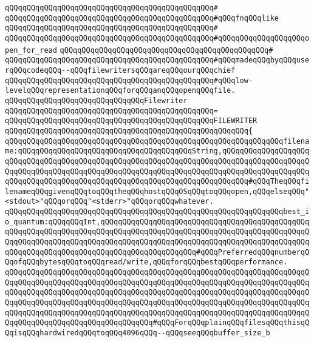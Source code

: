 \verb|qQQqqQQqqQQqqQQqqQQqqQQqqQQqqQQqqQQqqQQqqQQqqQQq#|\newline
\verb|qQQqqQQqqQQqqQQqqQQqqQQqqQQqqQQqqQQqqQQqqQQqqQQq#qQQqfnqQQqlike|\newline
\verb|qQQqqQQqqQQqqQQqqQQqqQQqqQQqqQQqqQQqqQQqqQQqqQQq#|\newline
\verb|qQQqqQQqqQQqqQQqqQQqqQQqqQQqqQQqqQQqqQQqqQQqqQQq#qQQqqQQqqQQqqQQqqQQqopen_for_read|\newline
\verb|qQQqqQQqqQQqqQQqqQQqqQQqqQQqqQQqqQQqqQQqqQQqqQQq#|\newline
\verb|qQQqqQQqqQQqqQQqqQQqqQQqqQQqqQQqqQQqqQQqqQQqqQQq#qQQqmadeqQQqbyqQQquserqQQqcodeqQQq--qQQqfilewritersqQQqareqQQqourqQQqchief|\newline
\verb|qQQqqQQqqQQqqQQqqQQqqQQqqQQqqQQqqQQqqQQqqQQqqQQq#qQQqlow-levelqQQqrepresentationqQQqforqQQqanqQQqopenqQQqfile.|\newline
\newline
\verb|qQQqqQQqqQQqqQQqqQQqqQQqqQQqqQQqFilewriter|\newline
\verb|qQQqqQQqqQQqqQQqqQQqqQQqqQQqqQQqqQQqqQQqqQQqqQQq=|\newline
\verb|qQQqqQQqqQQqqQQqqQQqqQQqqQQqqQQqqQQqqQQqqQQqqQQqFILEWRITER|\newline
\verb|qQQqqQQqqQQqqQQqqQQqqQQqqQQqqQQqqQQqqQQqqQQqqQQqqQQqqQQq{|\newline
\verb|qQQqqQQqqQQqqQQqqQQqqQQqqQQqqQQqqQQqqQQqqQQqqQQqqQQqqQQqqQQqqQQqfilename:qQQqqQQqqQQqqQQqqQQqqQQqqQQqqQQqqQQqqQQqString,qQQqqQQqqQQqqQQqqQQqqQQqqQQqqQQqqQQqqQQqqQQqqQQqqQQqqQQqqQQqqQQqqQQqqQQqqQQqqQQqqQQqqQQqqQQqqQQqqQQqqQQqqQQqqQQqqQQqqQQqqQQqqQQqqQQqqQQqqQQqqQQqqQQqqQQqqQQqqQQqqQQqqQQqqQQqqQQqqQQqqQQqqQQqqQQqqQQqqQQqqQQqqQQqqQQqqQQq#qQQqTheqQQqfilenameqQQqgivenqQQqtoqQQqtheqQQqhostqQQqOSqQQqtoqQQqopen,qQQqelseqQQq"<stdout>"qQQqorqQQq"<stderr>"qQQqorqQQqwhatever.|\newline
\newline
\verb|qQQqqQQqqQQqqQQqqQQqqQQqqQQqqQQqqQQqqQQqqQQqqQQqqQQqqQQqqQQqqQQqbest_io_quantum:qQQqqQQqInt,qQQqqQQqqQQqqQQqqQQqqQQqqQQqqQQqqQQqqQQqqQQqqQQqqQQqqQQqqQQqqQQqqQQqqQQqqQQqqQQqqQQqqQQqqQQqqQQqqQQqqQQqqQQqqQQqqQQqqQQqqQQqqQQqqQQqqQQqqQQqqQQqqQQqqQQqqQQqqQQqqQQqqQQqqQQqqQQqqQQqqQQqqQQqqQQqqQQqqQQqqQQqqQQqqQQqqQQqqQQqqQQqqQQqqQQq#qQQqPreferredqQQqnumberqQQqofqQQqbytesqQQqtoqQQqread/write,qQQqforqQQqbestqQQqperformance.|\newline
\verb|qQQqqQQqqQQqqQQqqQQqqQQqqQQqqQQqqQQqqQQqqQQqqQQqqQQqqQQqqQQqqQQqqQQqqQQqqQQqqQQqqQQqqQQqqQQqqQQqqQQqqQQqqQQqqQQqqQQqqQQqqQQqqQQqqQQqqQQqqQQqqQQqqQQqqQQqqQQqqQQqqQQqqQQqqQQqqQQqqQQqqQQqqQQqqQQqqQQqqQQqqQQqqQQqqQQqqQQqqQQqqQQqqQQqqQQqqQQqqQQqqQQqqQQqqQQqqQQqqQQqqQQqqQQqqQQqqQQqqQQqqQQqqQQqqQQqqQQqqQQqqQQqqQQqqQQqqQQqqQQqqQQqqQQqqQQqqQQqqQQqqQQqqQQqqQQqqQQqqQQqqQQqqQQqqQQqqQQqqQQqqQQq#qQQqForqQQqplainqQQqfilesqQQqthisqQQqisqQQqhardwiredqQQqtoqQQq4096qQQq--qQQqseeqQQqbuffer_size_b|\newline
